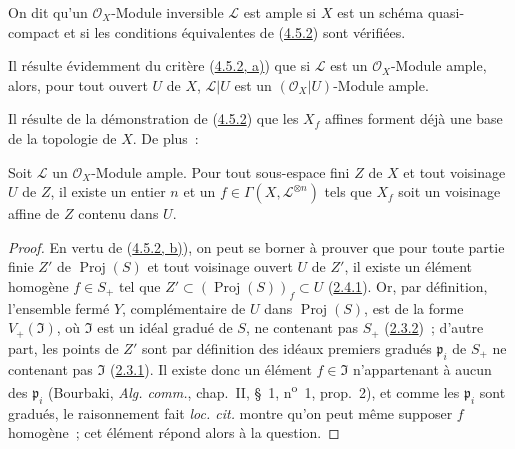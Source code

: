 \begin{definition}[4.5.3]
\label{II.4.5.3-fr}
On dit qu'un $\mathcal{O}_X$-Module inversible $\mathcal{L}$ est ample si
$X$ est un schéma quasi-compact et si les conditions équivalentes de
(\hyperref[II.4.5.2-fr]{4.5.2}) sont vérifiées.
\end{definition}

Il résulte évidemment du critère (\hyperref[II.4.5.2-fr]{4.5.2, a)}) que si
$\mathcal{L}$ est un $\mathcal{O}_X$-Module ample, alors, pour tout ouvert
$U$ de $X$, $\mathcal{L}|U$ est un $(\mathcal{O}_X|U)$-Module ample.

Il résulte de la démonstration de (\hyperref[II.4.5.2-fr]{4.5.2}) que les
$X_f$ affines forment déjà une base de la topologie de $X$. De plus~:

\begin{corollary}[4.5.4]
\label{II.4.5.4-fr}
Soit $\mathcal{L}$ un $\mathcal{O}_X$-Module ample. Pour tout sous-espace fini
$Z$ de $X$ et tout voisinage $U$ de $Z$, il existe un entier $n$ et un
$f\in\Gamma(X,\mathcal{L}^{\otimes n})$ tels que $X_f$ soit un voisinage
affine de $Z$ contenu dans $U$.
\end{corollary}

\begin{proof}

En vertu de (\hyperref[II.4.5.2-fr]{4.5.2, b)}), on peut se borner à prouver
que pour toute partie finie $Z'$ de $\operatorname{Proj}(S)$ et tout
voisinage ouvert $U$ de $Z'$, il existe un élément homogène $f\in S_+$ tel
que $Z'\subset(\operatorname{Proj}(S))_f\subset U$
(\hyperref[II.2.4.1-fr]{2.4.1}). Or, par définition, l'ensemble fermé $Y$,
complémentaire de $U$ dans $\operatorname{Proj}(S)$, est de la forme
$V_+(\mathfrak{I})$, où $\mathfrak{I}$ est un idéal gradué de $S$, ne
contenant pas $S_+$ (\hyperref[II.2.3.2-fr]{2.3.2})~; d'autre part, les
points de $Z'$ sont par définition des idéaux premiers gradués
$\mathfrak{p}_i$ de $S_+$ ne contenant pas $\mathfrak{I}$
(\hyperref[II.2.3.1-fr]{2.3.1}). Il existe donc un élément
$f\in\mathfrak{I}$ n'appartenant à aucun des $\mathfrak{p}_i$ (Bourbaki,
\emph{Alg. comm.}, chap.~II, \S~1, n\textsuperscript{o}~1, prop.~2), et comme
les $\mathfrak{p}_i$ sont gradués, le raisonnement fait \emph{loc. cit.}
montre qu'on peut même supposer $f$ homogène~; cet élément répond alors à la
question.
\end{proof}

